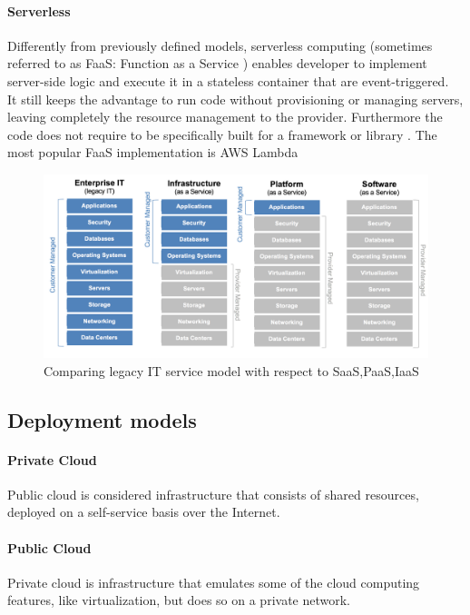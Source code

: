 \paragraph{Serverless}
\label{paragraph:Serverless}
Differently from previously defined models, serverless computing (sometimes referred to as FaaS: Function as a Service \cite{manna}) enables developer to implement server-side logic and execute it in a stateless container that are event-triggered.\\
It still keeps the advantage to run code without provisioning or managing servers, leaving completely the resource management to the provider.
Furthermore the code does not require to be specifically built for a framework or library \cite{martin_serverless}.
The most popular FaaS implementation is AWS Lambda

\begin{figure}[h]
    \centering
    \includegraphics[width=\textwidth,keepaspectratio]{img/saas_paas_iaas}
    \caption{Comparing legacy IT service model with respect to SaaS,PaaS,IaaS}
    \label{fig:saas_paas_iaas}
\end{figure}

\subsection{Deployment models}
\paragraph{Private Cloud}
\label{paragraph:Private Cloud}
Public cloud is considered infrastructure that consists of shared resources, deployed on a self-service basis over the Internet.
\paragraph{Public Cloud}
\label{paragraph:Public Cloud}
Private cloud is infrastructure that emulates some of the cloud computing features, like virtualization, but does so on a private network.
